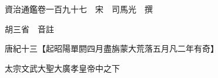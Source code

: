 










 


 
 


 

  
  
  
  
  





  
  
  
  
  
 
  

  

  
  
  



  

 
 

  
   




  

  
  


  　　資治通鑑卷一百九十七　宋　司馬光　撰

　　胡三省　音註

　　唐紀十三【起昭陽單閼四月盡旃蒙大荒落五月凡二年有奇】

　　太宗文武大聖大廣孝皇帝中之下

